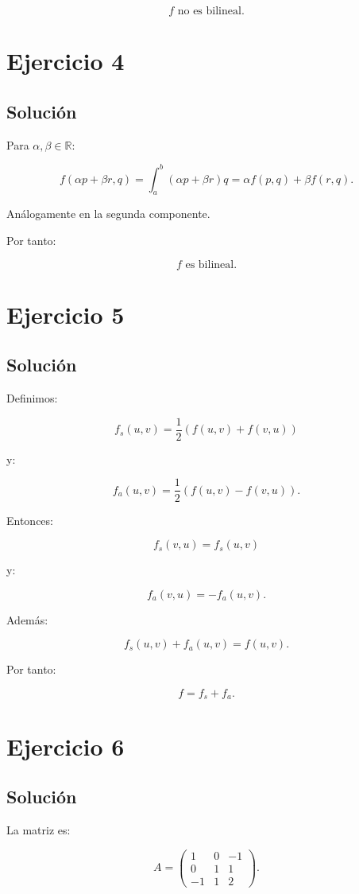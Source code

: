\documentclass[11pt,a4paper]{article}
\newcommand{\R}{\mathbb{R}}
\begin{document}
\[
\boxed{f\text{ no es bilineal}.}
\]

\section{Ejercicio 4}
\subsection{Solución}

Para $\alpha,\beta\in\R$:

\[
f(\alpha p+\beta r,q)
=
\int_a^b(\alpha p+\beta r)q
=
\alpha f(p,q)+\beta f(r,q).
\]

Análogamente en la segunda componente.

Por tanto:

\[
\boxed{f\text{ es bilineal}.}
\]

\section{Ejercicio 5}
\subsection{Solución}

Definimos:

\[
f_s(u,v)
=
\frac12\left(f(u,v)+f(v,u)\right)
\]

y:

\[
f_a(u,v)
=
\frac12\left(f(u,v)-f(v,u)\right).
\]

Entonces:

\[
f_s(v,u)=f_s(u,v)
\]

y:

\[
f_a(v,u)=-f_a(u,v).
\]

Además:

\[
f_s(u,v)+f_a(u,v)=f(u,v).
\]

Por tanto:

\[
\boxed{f=f_s+f_a.}
\]

\section{Ejercicio 6}
\subsection{Solución}

La matriz es:

\[
\boxed{
A=
\begin{pmatrix}
1&0&-1\\
0&1&1\\
-1&1&2
\end{pmatrix}.
}
\]
\end{document}
